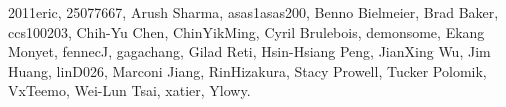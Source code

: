 2011eric,            %
25077667,            %
Arush Sharma,        %
asas1asas200,        %
Benno Bielmeier,     %
Brad Baker,          %
ccs100203,           %
Chih-Yu Chen,        %
ChinYikMing,         %
Cyril Brulebois,     %
demonsome,           %
Ekang Monyet,        %
fennecJ,             %
gagachang,           %
Gilad Reti,          %
Hsin-Hsiang Peng,    %
JianXing Wu,         %
Jim Huang,           %
linD026,             %
Marconi Jiang,       %
RinHizakura,         %
Stacy Prowell,       %
Tucker Polomik,      %
VxTeemo,             %
Wei-Lun Tsai,        %
xatier,              %
Ylowy.               %
